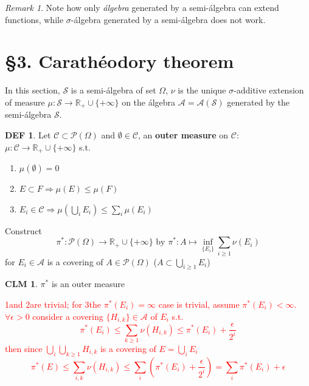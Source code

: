 \documentclass[hidelinks]{article}
\theoremstyle{definition}
\newtheorem*{defin}{DEF}
\theoremstyle{dotless}
\newtheorem{claim}{CLM}[section]
\theoremstyle{remark}
\newtheorem*{remark}{Remark}
\begin{document}
\begin{remark}
Note how only \emph{álgebra} generated by a semi-álgebra can extend functions, while $\sigma$-álgebra generated by a semi-álgebra does not work.
\end{remark}

\bigbreak

\section*{\S3. Carathéodory theorem}
\setcounter{section}{3}

In this section, $\mathscr{S}$ is a semi-álgebra of set $\Omega$, $\nu$ is the unique $\sigma$-additive extension of measure $\mu:\mathscr{S}\to\mathbb{R}_+\cup\{+\infty\}$ on the álgebra $\mathscr{A}=\mathscr{A}(\mathscr{S})$ generated by the semi-álgebra $\mathscr{S}$.

\begin{defin}
Let $\mathscr{C}\subset\mathscr{P}(\Omega)$ and $\emptyset\in\mathscr{C}$, an \textbf{outer measure} on $\mathscr{C}$: $\mu:\mathscr{C}\to\mathbb{R}_+\cup\{+\infty\}$ s.t.\begin{enumerate}[label=\arabic*\degree]
    \item $\mu(\emptyset)=0$
    \item $E\subset F\Rightarrow\mu(E)\leq\mu(F)$
    \item $E_i\in\mathscr{C}\Rightarrow\mu(\bigcup\limits_iE_i)\leq\sum\limits_i\mu(E_i)$
\end{enumerate}
\end{defin}

Construct
\[\pi^*:\mathscr{P}(\Omega)\to\mathbb{R}_+\cup\{+\infty\}\textrm{ by }\pi^*:A\mapsto\inf\limits_{\{E_i\}}\sum\limits_{i\geq1}\nu(E_i)\]
for ${E_i}\in\mathscr{A}$ is a covering of $A\in\mathscr{P}(\Omega)$ ($A\subset\bigcup\limits_{i\geq1}E_i$)

\begin{claim}\label{CLM 3.5}
$\pi^*$ is an outer measure
\end{claim}
\textcolor{red}{1\degree and 2\degree are trivial; for 3\degree the $\pi^*(E_i)=\infty$ case is trivial, assume $\pi^*(E_i)<\infty$. $\forall\epsilon>0$ consider a covering $\{H_{i,k}\}\in\mathscr{A}$ of $E_i$ s.t.
\[\pi^*(E_i)\leq\sum_{k\geq1}\nu(H_{i,k})\leq\pi^*(E_i)+\frac{\epsilon}{2^i}\]
then since $\bigcup\limits_i\bigcup\limits_{k\geq1}H_{i,k}$ is a covering of $E=\bigcup\limits_iE_i$
\[\pi^*(E)\leq\sum\limits_{i,k}\nu(H_{i,k})\leq\sum\limits_i(\pi^*(E_i)+\frac{\epsilon}{2^i})=\sum\limits_i\pi^*(E_i)+\epsilon\]}
\end{document}
